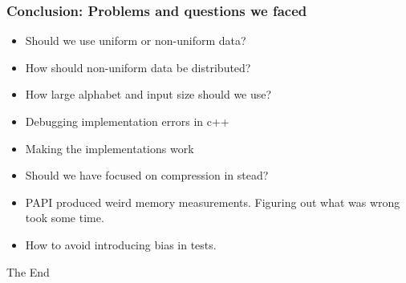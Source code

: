 \documentclass{beamer}
\begin{document}
\begin{frame}
\frametitle{Conclusion: Problems and questions we faced}
\begin{itemize}
\item Should we use uniform or non-uniform data?
\item How should non-uniform data be distributed?
\item How large alphabet and input size should we use?
\item Debugging implementation errors in c++
\item Making the implementations work
\item Should we have focused on compression in stead?
\item PAPI produced weird memory measurements. Figuring out what was wrong took some time.
\item How to avoid introducing bias in tests.
\end{itemize}
\end{frame}


\begin{frame}
\Huge{\centerline{The End}}
\end{frame}

\end{document}

